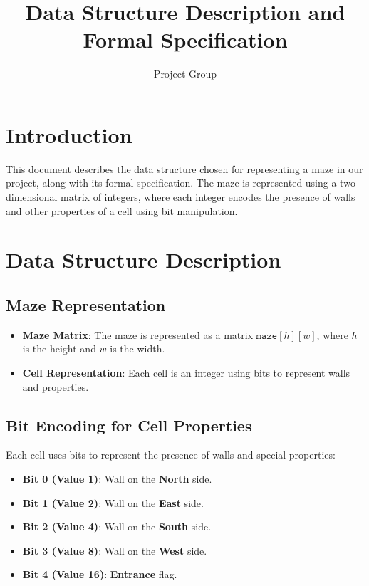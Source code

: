 \documentclass{article}
\begin{document}
\title{Data Structure Description and Formal Specification}
\author{Project Group}
\date{}

\maketitle

\section*{Introduction}

This document describes the data structure chosen for representing a maze in our project, along with its formal specification. The maze is represented using a two-dimensional matrix of integers, where each integer encodes the presence of walls and other properties of a cell using bit manipulation.

\section*{Data Structure Description}

\subsection*{Maze Representation}

\begin{itemize}[noitemsep]
    \item \textbf{Maze Matrix}: The maze is represented as a matrix $\texttt{maze}[h][w]$, where $h$ is the height and $w$ is the width.
    \item \textbf{Cell Representation}: Each cell is an integer using bits to represent walls and properties.
\end{itemize}

\subsection*{Bit Encoding for Cell Properties}

Each cell uses bits to represent the presence of walls and special properties:

\begin{itemize}[noitemsep]
    \item \textbf{Bit 0 (Value 1)}: Wall on the \textbf{North} side.
    \item \textbf{Bit 1 (Value 2)}: Wall on the \textbf{East} side.
    \item \textbf{Bit 2 (Value 4)}: Wall on the \textbf{South} side.
    \item \textbf{Bit 3 (Value 8)}: Wall on the \textbf{West} side.
    \item \textbf{Bit 4 (Value 16)}: \textbf{Entrance} flag.
\end{itemize}
\end{document}
